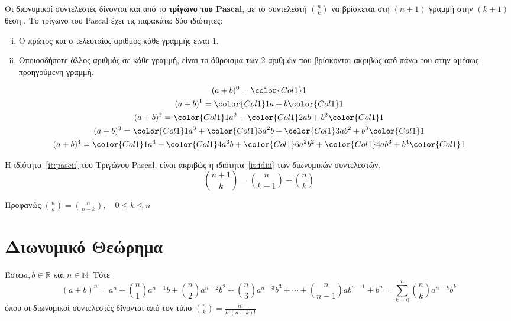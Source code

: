 \documentclass[a4paper,table]{report}
\newcommand{\twocolumnsidescc}[2]{\begin{minipage}[c]{0.48\linewidth}\raggedright
        #1
        \end{minipage}\hfill\begin{minipage}[c]{0.48\linewidth}\raggedright
        #2
    \end{minipage}
}
\begin{document}
Οι \textcolor{Col1}{διωνυμικοί συντελεστές} δίνονται και από το 
\textbf{τρίγωνο του Pascal}, με το συντελεστή $ \textstyle{\binom{n}{k}} $ να 
βρίσκεται στη $ (n+1) $ γραμμή στην $ (k+1) $ θέση .
Το τρίγωνο του Pascal έχει τις παρακάτω δύο ιδιότητες:
\begin{enumerate}[i)]\label{en:pasc}
  \item Ο πρώτος και ο τελευταίος αριθμός κάθε γραμμής είναι $1$.
  \item \label{it:pascii} Οποιοσδήποτε άλλος αριθμός σε κάθε γραμμή, είναι το 
    άθροισμα των 2 αριθμών που βρίσκονται ακριβώς από πάνω του στην αμέσως 
    προηγούμενη γραμμή.
\end{enumerate}
\twocolumnsidescc{
  \begin{gather*}
    (a+b)^{0}={\color{Col1}1} \\
    (a+b)^{1}={\color{Col1}1}a+b{\color{Col1}1} \\
    (a+b)^{2}={\color{Col1}1}a^{2}+{\color{Col1}2}ab
    +b^{2}{\color{Col1}1} \\
    (a+b)^{3}={\color{Col1}1}a^{3}+{\color{Col1}3}a^{2}b
    +{\color{Col1}3}ab^{2}+b^{3}{\color{Col1}1} \\
    (a+b)^{4}={\color{Col1}1}a^{4}+{\color{Col1}4}a^{3}b
    +{\color{Col1}6}a^{2}b^{2}+{\color{Col1}4}ab^{3}
    +b^{4}{\color{Col1}1} 
  \end{gather*}
  }{
  \begin{myitemize}
    \item Η ιδlότητα~\ref{it:pascii} του Τριγώνου Pascal, είναι ακριβώς η
      ιδιότητα~\ref{it:idiii} των διωνυμικών συντελεστών. 
      \[ \binom{n+1}{k} = \binom{n}{k-1} + \binom{n}{k} \]
    \item Προφανώς $ \binom{n}{k} = \binom{n}{n-k}, \quad 0 \leq k \leq n $
  \end{myitemize}
}



\section*{Διωνυμικό Θεώρημα}

Έστω$ a,b \in \mathbb{R} $ και $ n \in \mathbb{N} $. Τότε
\[
  \boxed{(a+b)^{n} = a^{n} + \binom{n}{1} a^{n-1}b + 
    \binom{n}{2} a^{n-2}b^{2} + \binom{n}{3} a^{n-3}b^{3} + \cdots + 
  \binom{n}{n-1} ab^{n-1} + b^{n} = \sum_{k=0}^{n} \binom{n}{k} a^{n-k}b^{k}}
\]
όπου οι διωνυμικοί συντελεστές δίνονται από τον τύπο
$
\binom{n}{k} = \frac{n!}{k!(n-k)!}
$ 
\end{document}
